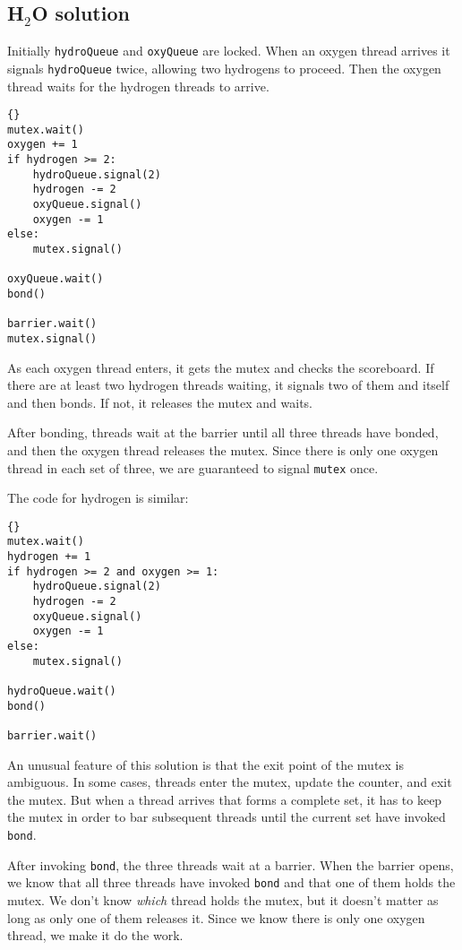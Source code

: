 \documentclass{book}
\newcommand{\clearemptydoublepage}{\newpage\cleardoublepage}
\begin{document}
\clearemptydoublepage
\subsection {H$_2$O solution}

Initially {\tt hydroQueue} and {\tt oxyQueue} are locked.  When
an oxygen thread arrives it signals {\tt hydroQueue} twice,
allowing two hydrogens to proceed.  Then the oxygen thread waits
for the hydrogen threads to arrive.

\begin{lstlisting}[title={Oxygen code}]{}
mutex.wait()
oxygen += 1
if hydrogen >= 2:
    hydroQueue.signal(2)
    hydrogen -= 2
    oxyQueue.signal()
    oxygen -= 1
else:
    mutex.signal()

oxyQueue.wait()
bond()

barrier.wait()
mutex.signal()
\end{lstlisting}

As each oxygen thread enters, it gets the mutex and checks the scoreboard.
If there are at least two hydrogen threads waiting, it signals two of
them and itself and then bonds.  If not, it releases the mutex and
waits.

After bonding, threads wait at the barrier until all three threads
have bonded, and then the oxygen thread releases the mutex.  Since
there is only one oxygen thread in each set of three, we are guaranteed
to signal {\tt mutex} once.

The code for hydrogen is similar:

\begin{lstlisting}[title={Hydrogen code}]{}
mutex.wait()
hydrogen += 1
if hydrogen >= 2 and oxygen >= 1:
    hydroQueue.signal(2)
    hydrogen -= 2
    oxyQueue.signal()
    oxygen -= 1
else:
    mutex.signal()

hydroQueue.wait()
bond()

barrier.wait()
\end{lstlisting}

An unusual feature of this solution is that
the exit point of the mutex is ambiguous.  In
some cases, threads enter the mutex, update the counter, and exit the
mutex.  But when a thread arrives that forms a complete set, it has to
keep the mutex in order to bar subsequent threads until the current
set have invoked {\tt bond}.

After invoking {\tt bond}, the three threads wait at a barrier.
When the barrier opens, we know that all three threads have invoked
{\tt bond} and that one of them holds the mutex.  We don't know
{\em which} thread holds the mutex, but it doesn't matter as long
as only one of them releases it.  Since we know there is only one
oxygen thread, we make it do the work.
\end{document}
